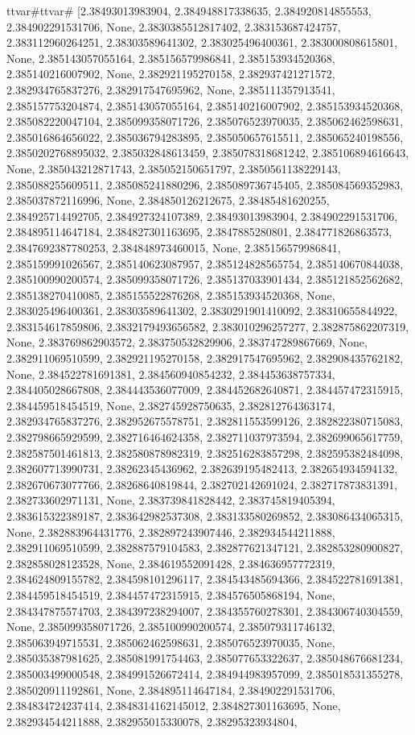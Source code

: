 \documentclass[
  11pt,
  french,
]{article}
\begin{document}
\begin{tcolorbox}[title= Répartition des volumes selon leurs caractéristiques ,colback=boitecode]
ttvar{#}ttvar{#} [2.38493013983904, 2.384948817338635, 2.384920814855553, 2.384902291531706, None, 2.3830385512817402, 2.383153687424757, 2.383112960264251, 2.38303589641302, 2.383025496400361, 2.383000808615801, None, 2.385143057055164, 2.385156579986841, 2.385153934520368, 2.385140216007902, None, 2.382921195270158, 2.382937421271572, 2.382934765837276, 2.382917547695962, None, 2.385111357913541, 2.385157753204874, 2.385143057055164, 2.385140216007902, 2.385153934520368, 2.385082220047104, 2.385099358071726, 2.385076523970035, 2.385062462598631, 2.385016864656022, 2.385036794283895, 2.385050657615511, 2.385065240198556, 2.3850202768895032, 2.385032848613459, 2.385078318681242, 2.385106894616643, None, 2.385043212871743, 2.385052150651797, 2.3850561138229143, 2.385088255609511, 2.385085241880296, 2.385089736745405, 2.385084569352983, 2.385037872116996, None, 2.384850126212675, 2.38485481620255, 2.384925714492705, 2.384927324107389, 2.38493013983904, 2.384902291531706, 2.384895114647184, 2.384827301163695, 2.3847885280801, 2.384771826863573, 2.3847692387780253, 2.384848973460015, None, 2.385156579986841, 2.385159991026567, 2.385140623087957, 2.385124828565754, 2.385140670844038, 2.385100990200574, 2.385099358071726, 2.385137033901434, 2.385121852562682, 2.385138270410085, 2.385155522876268, 2.385153934520368, None, 2.383025496400361, 2.38303589641302, 2.3830291901410092, 2.38310655844922, 2.383154617859806, 2.3832179493656582, 2.383010296257277, 2.382875862207319, None, 2.383769862903572, 2.383750532829906, 2.383747289867669, None, 2.382911069510599, 2.382921195270158, 2.382917547695962, 2.382908435762182, None, 2.384522781691381, 2.384560940854232, 2.384453638757334, 2.384405028667808, 2.384443536077009, 2.384452682640871, 2.384457472315915, 2.384459518454519, None, 2.382745928750635, 2.382812764363174, 2.382934765837276, 2.382952675578751, 2.382811553599126, 2.382822380715083, 2.382798665929599, 2.382716464624358, 2.382711037973594, 2.382699065617759, 2.382587501461813, 2.382580878982319, 2.382516283857298, 2.382595382484098, 2.382607713990731, 2.38262345436962, 2.382639195482413, 2.382654934594132, 2.382670673077766, 2.38268640819844, 2.382702142691024, 2.382717873831391, 2.382733602971131, None, 2.383739841828442, 2.383745819405394, 2.383615322389187, 2.383642982537308, 2.383133580269852, 2.383086434065315, None, 2.382883964431776, 2.382897243907446, 2.382934544211888, 2.382911069510599, 2.382887579104583, 2.382877621347121, 2.382853280900827, 2.382858028123528, None, 2.384619552091428, 2.384636957772319, 2.384624809155782, 2.384598101296117, 2.384543485694366, 2.384522781691381, 2.384459518454519, 2.384457472315915, 2.384576505868194, None, 2.384347875574703, 2.384397238294007, 2.384355760278301, 2.384306740304559, None, 2.385099358071726, 2.385100990200574, 2.385079311746132, 2.385063949715531, 2.385062462598631, 2.385076523970035, None, 2.385035387981625, 2.385081991754463, 2.385077653322637, 2.385048676681234, 2.385003499000548, 2.384991526672414, 2.384944983957099, 2.385018531355278, 2.385020911192861, None, 2.384895114647184, 2.384902291531706, 2.384834724237414, 2.3848314162145012, 2.384827301163695, None, 2.382934544211888, 2.382955015330078, 2.38295323934804, 
\end{tcolorbox}
\end{document}
